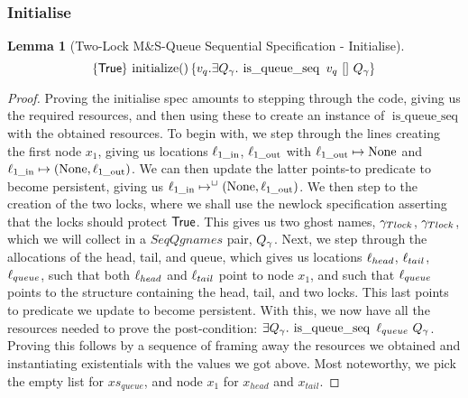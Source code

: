 \documentclass[a4paper, 11pt]{report}
\newtheorem{lemma}[theorem]{Lemma}
\newcommand{\initialise}{\operatorname{initialize}}
\newcommand{\tlmsq}{Two-Lock M\&S-Queue\xspace}
\newcommand{\isqueueseq}{\operatorname{is\_queue\_seq}}
\newcommand{\SeqQgnames}{SeqQgnames}
\newcommand{\locin}[1]{\loc_{#1\_\text{in}}}
\newcommand{\locout}[1]{\loc_{#1\_\text{out}}}
\newcommand{\tlseqspecinit}{\hoare{\TRUE}{\initialise \TT}{v_q . \Exists Q_\gname. \isqueueseq\ v_q\ []\ Q_\gname}}
\begin{document}
\subsubsection{Initialise}
\begin{lemma}[\tlmsq Sequential Specification - Initialise]\label{TLMSQ:spec:seq:init}
  \begin{equation*}
    \tlseqspecinit
  \end{equation*}
\end{lemma}
\begin{proof}
Proving the initialise spec amounts to stepping through the code, giving us the required resources, and then using these to create an instance of $\isqueueseq$ with the obtained resources. To begin with, we step through the lines creating the first node $x_1$, giving us locations $\locin{1}$, $\locout{1}$ with $\locout{1} \mapsto \None$ and $\locin{1} \mapsto (\None, \locout{1})$. We can then update the latter points-to predicate to become persistent, giving us $\locin{1} \mapsto^{\persistently} (\None, \locout{1})$. We then step to the creation of the two locks, where we shall use the newlock specification asserting that the locks should protect $\textsf{True}$. This gives us two ghost names, $\gamma_{Tlock}$, $\gamma_{Tlock}$, which we will collect in a $\SeqQgnames$ pair, $Q_\gamma$.
Next, we step through the allocations of the head, tail, and queue, which gives us locations $\ell_{head}$, $\ell_{tail}$, $\ell_{queue}$, such that both $\ell_{head}$ and $\ell_{tail}$ point to node $x_1$, and such that $\ell_{queue}$ points to the structure containing the head, tail, and two locks. This last points to predicate we update to become persistent.
With this, we now have all the resources needed to prove the post-condition: $\Exists Q_\gname . \isqueueseq \ \loc_{queue} \ Q_\gname$. Proving this follows by a sequence of framing away the resources we obtained and instantiating existentials with the values we got above. Most noteworthy, we pick the empty list for $xs_{queue}$, and node $x_1$ for $x_{head}$ and $x_{tail}$.
\end{proof}
\end{document}
